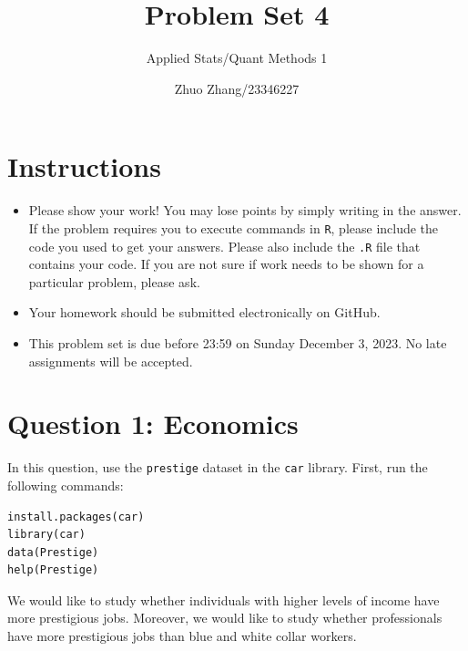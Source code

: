 \documentclass[12pt,letterpaper]{article}
\title{Problem Set 4}
\date{Zhuo Zhang/23346227}
\author{Applied Stats/Quant Methods 1}
\begin{document}
	\maketitle
	\section*{Instructions}
	\begin{itemize}
		\item Please show your work! You may lose points by simply writing in the answer. If the problem requires you to execute commands in \texttt{R}, please include the code you used to get your answers. Please also include the \texttt{.R} file that contains your code. If you are not sure if work needs to be shown for a particular problem, please ask.
		\item Your homework should be submitted electronically on GitHub.
		\item This problem set is due before 23:59 on Sunday December 3, 2023. No late assignments will be accepted.
	\end{itemize}



	\vspace{.5cm}
\section*{Question 1: Economics}
\vspace{.25cm}
\noindent 	
In this question, use the \texttt{prestige} dataset in the \texttt{car} library. First, run the following commands:

\begin{verbatim}
install.packages(car)
library(car)
data(Prestige)
help(Prestige)
\end{verbatim} 


\noindent We would like to study whether individuals with higher levels of income have more prestigious jobs. Moreover, we would like to study whether professionals have more prestigious jobs than blue and white collar workers.
\end{document}
